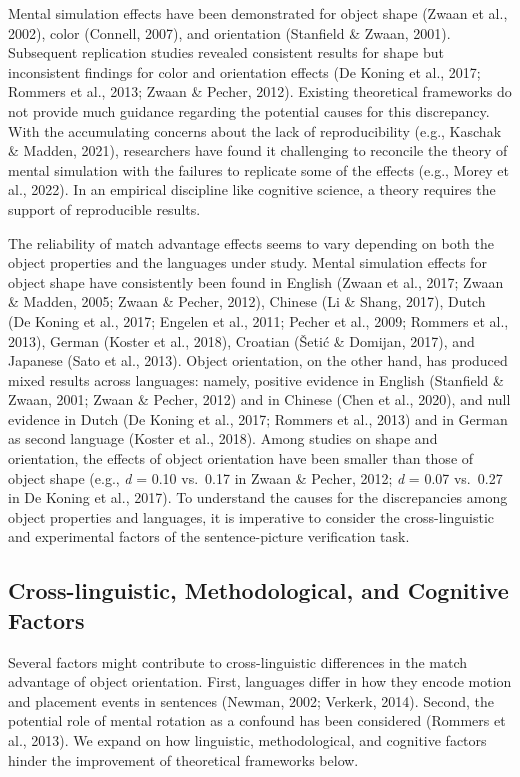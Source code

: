 \documentclass[
  man,floatsintext]{apa7}
\begin{document}
Mental simulation effects have been demonstrated for object shape
(Zwaan et al., 2002), color
(Connell, 2007), and orientation
(Stanfield \& Zwaan, 2001). Subsequent replication studies revealed
consistent results for shape but inconsistent findings for color and
orientation effects (De Koning et al., 2017; Rommers et al., 2013; Zwaan \& Pecher, 2012). Existing theoretical frameworks
do not provide much guidance regarding the potential causes for this
discrepancy. With the accumulating concerns about the lack of
reproducibility (e.g., Kaschak \& Madden, 2021), researchers
have found it challenging to reconcile the theory of mental simulation
with the failures to replicate some of the effects (e.g., Morey et al., 2022).
In an empirical discipline like cognitive science, a theory requires the
support of reproducible results.

The reliability of match advantage effects seems to vary depending on
both the object properties and the languages under study. Mental
simulation effects for object shape have consistently been found in
English (Zwaan et al., 2017; Zwaan \& Madden, 2005; Zwaan \& Pecher, 2012), Chinese (Li \& Shang, 2017),
Dutch (De Koning et al., 2017; Engelen et al., 2011; Pecher et al., 2009; Rommers et al., 2013), German
(Koster et al., 2018), Croatian
(Šetić \& Domijan, 2017), and Japanese
(Sato et al., 2013). Object orientation, on the other hand, has
produced mixed results across languages: namely, positive evidence in
English (Stanfield \& Zwaan, 2001; Zwaan \& Pecher, 2012)
and in Chinese (Chen et al., 2020), and null evidence in Dutch
(De Koning et al., 2017; Rommers et al., 2013) and in German
as second language (Koster et al., 2018). Among studies on
shape and orientation, the effects of object orientation have been
smaller than those of object shape (e.g., \emph{d} = 0.10 vs.~0.17 in
Zwaan \& Pecher, 2012; \emph{d} = 0.07 vs.~0.27 in De Koning et al., 2017). To understand the causes for the discrepancies
among object properties and languages, it is imperative to consider the
cross-linguistic and experimental factors of the sentence-picture
verification task.

\hypertarget{cross-linguistic-methodological-and-cognitive-factors}{%
\subsection{Cross-linguistic, Methodological, and Cognitive Factors}\label{cross-linguistic-methodological-and-cognitive-factors}}

Several factors might contribute to cross-linguistic differences in the
match advantage of object orientation. First, languages differ in how
they encode motion and placement events in sentences
(Newman, 2002; Verkerk, 2014). Second, the
potential role of mental rotation as a confound has been considered
(Rommers et al., 2013). We expand on how linguistic,
methodological, and cognitive factors hinder the improvement of
theoretical frameworks below.
\end{document}
